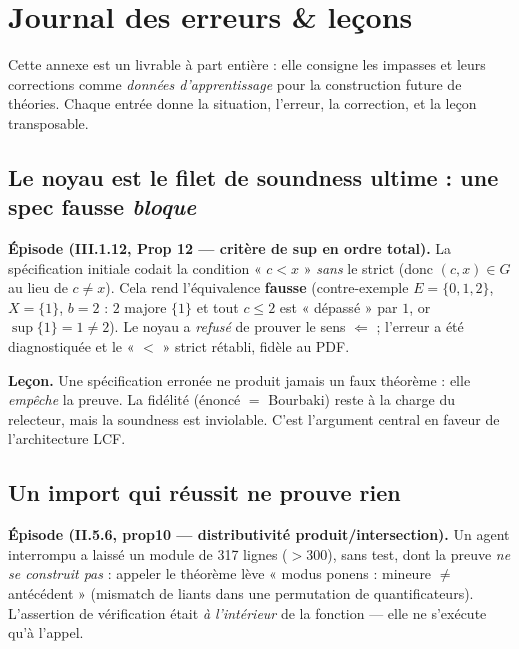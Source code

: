 \section{Journal des erreurs \& leçons}

Cette annexe est un livrable à part entière : elle consigne les impasses et
leurs corrections comme \emph{données d'apprentissage} pour la construction
future de théories. Chaque entrée donne la situation, l'erreur, la correction,
et la leçon transposable.

\subsection{Le noyau est le filet de soundness ultime : une spec fausse \emph{bloque}}

\textbf{Épisode (III.1.12, Prop 12 --- critère de sup en ordre total).} La
spécification initiale codait la condition « $c<x$ » \emph{sans} le strict (donc
$(c,x)\in G$ au lieu de $c\neq x$). Cela rend l'équivalence \textbf{fausse}
(contre-exemple $E=\{0,1,2\}$, $X=\{1\}$, $b=2$ : $2$ majore $\{1\}$ et tout
$c\leq 2$ est « dépassé » par $1$, or $\sup\{1\}=1\neq 2$). Le noyau a
\emph{refusé} de prouver le sens $\Leftarrow$ ; l'erreur a été diagnostiquée et
le « $<$ » strict rétabli, fidèle au PDF.

\textbf{Leçon.} Une spécification erronée ne produit jamais un faux théorème :
elle \emph{empêche} la preuve. La fidélité (énoncé $=$ Bourbaki) reste à la
charge du relecteur, mais la soundness est inviolable. C'est l'argument central
en faveur de l'architecture LCF.

\subsection{Un import qui réussit ne prouve rien}

\textbf{Épisode (II.5.6, prop10 --- distributivité produit/intersection).} Un
agent interrompu a laissé un module de 317 lignes (${>}300$), sans test, dont la
preuve \emph{ne se construit pas} : appeler le théorème lève « modus ponens :
mineure $\neq$ antécédent » (mismatch de liants dans une permutation de
quantificateurs). L'assertion de vérification était \emph{à l'intérieur} de la
fonction --- elle ne s'exécute qu'à l'appel.

